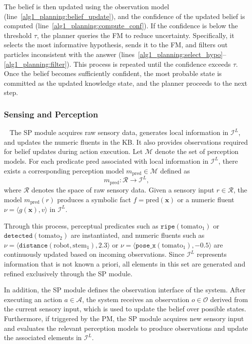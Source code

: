 The belief is then updated using the observation model (line~\ref{alg1_planning:belief_update}), and the confidence of the updated belief is computed (line~\ref{alg1_planning:compute_conf}). If the confidence is below the threshold $\tau$, the planner queries the FM to reduce uncertainty. Specifically, it selects the most informative hypothesis, sends it to the FM, and filters out particles inconsistent with the answer (lines~\ref{alg1_planning:select_hypo}--\ref{alg1_planning:filter}). This process is repeated until the confidence exceeds $\tau$. Once the belief becomes sufficiently confident, the most probable state is committed as the updated knowledge state, and the planner proceeds to the next step.
\subsubsection{Sensing and Perception}~\label{method:SP}
The SP module acquires raw sensory data, generates local information in $\mathcal{I}^{L}$, and updates the numeric fluents in the KB. It also provides observations required for belief updates during action execution. Let $\mathcal{M}$ denote the set of perception models. For each predicate $\text{pred}$ associated with local information in $\mathcal{I}^{L}$, there exists a corresponding perception model $m_{\text{pred}} \in \mathcal{M}$ defined as
\[
m_{\text{pred}} : \mathcal{R} \rightarrow \mathcal{I}^{L},
\]
where $\mathcal{R}$ denotes the space of raw sensory data. Given a sensory input $r \in \mathcal{R}$, the model $m_{\text{pred}}(r)$ produces a symbolic fact $f = \text{pred}(\mathbf{x})$ or a numeric fluent $\nu = \langle g(\mathbf{x}), v \rangle$ in $\mathcal{I}^{L}$.

Through this process, perceptual predicates such as $\texttt{ripe}(\text{tomato}_1)$ or $\texttt{detected}(\text{tomato}_2)$ are instantiated, and numeric fluents such as $\nu = \langle \texttt{distance}(\text{robot}, \text{stem}_1), 2.3 \rangle$ or $\nu = \langle \texttt{pose\_x}(\text{tomato}_1), -0.5 \rangle$ are continuously updated based on incoming observations. Since $\mathcal{I}^{L}$ represents information that is not known a priori, all elements in this set are generated and refined exclusively through the SP module.

In addition, the SP module defines the observation interface of the system. After executing an action $a \in \mathcal{A}$, the system receives an observation $o \in \mathcal{O}$ derived from the current sensory input, which is used to update the belief over possible states. Furthermore, if triggered by the PM, the SP module acquires new sensory input and evaluates the relevant perception models to produce observations and update the associated elements in $\mathcal{I}^{L}$.





